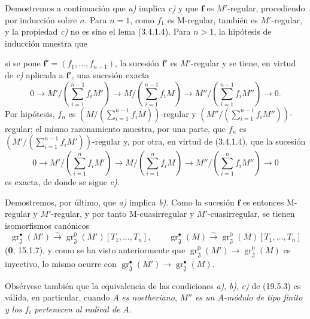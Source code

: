 Demostremos a continuación que \emph{a)} implica \emph{c)} y que $\mathbf f$ es $M'$-regular, procediendo por inducción sobre $n$. Para $n=1$, como $f_1$ es M-regular, también es $M'$-regular, y la propiedad \emph{c)} no es sino el lema (3.4.1.4). Para $n>1$, la hipótesis de inducción muestra que


si se pone $\mathbf f'=(f_1,\ldots,f_{n-1})$, la sucesión $\mathbf f'$ es $M'$-regular y se tiene, en virtud de \emph{c)} aplicada a $\mathbf f'$, una sucesión exacta
\[
  0\longrightarrow M'/(\textstyle\sum_{i=1}^{n-1}f_iM')\longrightarrow M/(\textstyle\sum_{i=1}^{n-1}f_iM)\longrightarrow M''/(\textstyle\sum_{i=1}^{n-1}f_iM'')\longrightarrow0.
\]
Por hipótesis, $f_n$ es $(M/(\sum_{i=1}^{n-1}f_iM))$-regular y $(M''/(\sum_{i=1}^{n-1}f_iM''))$-regular; el mismo razonamiento muestra, por una parte, que $f_n$ es $(M'/(\sum_{i=1}^{n-1}f_iM'))$-regular y, por otra, en virtud de (3.4.1.4), que la sucesión
\[
  0\longrightarrow M'/(\textstyle\sum_{i=1}^{n}f_iM')\longrightarrow M/(\textstyle\sum_{i=1}^{n}f_iM)\longrightarrow M''/(\textstyle\sum_{i=1}^{n}f_iM'')\longrightarrow0
\]
es exacta, de donde se sigue \emph{c)}.

Demostremos, por último, que \emph{a)} implica \emph{b)}. Como la sucesión $\mathbf f$ es entonces M-regular y $M'$-regular, y por tanto M-cuasirregular y $M'$-cuasirregular, se tienen isomorfismos canónicos
\[
  \operatorname{gr}_{\mathfrak J}^\bullet(M')\xrightarrow{\sim}\operatorname{gr}_{\mathfrak J}^0(M')[T_1,\ldots,T_n],
  \qquad
  \operatorname{gr}_{\mathfrak J}^\bullet(M)\xrightarrow{\sim}\operatorname{gr}_{\mathfrak J}^0(M)[T_1,\ldots,T_n]
\]
(\textbf{0}, 15.1.7), y como se ha visto anteriormente que $\operatorname{gr}_{\mathfrak J}^0(M')\to\operatorname{gr}_{\mathfrak J}^0(M)$ es inyectivo, lo mismo ocurre con $\operatorname{gr}_{\mathfrak J}^\bullet(M')\to\operatorname{gr}_{\mathfrak J}^\bullet(M)$.

Obsérvese también que la equivalencia de las condiciones \emph{a)}, \emph{b)}, \emph{c)} de (19.5.3) es válida, en particular, cuando $A$ \emph{es noetheriano}, $M''$ \emph{es un $A$-módulo de tipo finito y los $f_i$ pertenecen al radical de} $A$.

